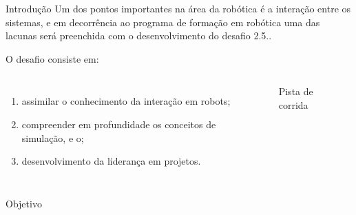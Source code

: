 \begin{frame}[t]{Introdução} 
    \transdissolve[duration=0.5]
    Um dos pontos importantes na área da robótica é a interação entre os sistemas, e em decorrência ao programa de formação em robótica uma das lacunas será preenchida com o desenvolvimento do desafio 2.5..

    O desafio consiste em:
        \begin{columns}[t]
                \begin{enumerate}
                    \item assimilar o conhecimento da interação em robots;
                    \item compreender em profundidade os conceitos de simulação, e o;
                    \item desenvolvimento da liderança em projetos.
                \end{enumerate}
            \begin{center}
                \begin{figure}
                    \caption{Pista de corrida \cite{agostini2007}}
                \end{figure}
            \end{center}
        \end{columns}
\end{frame}
\begin{frame}[c]{Objetivo} 
    \transdissolve[duration=0.5]
   
    \begin{center}
    \end{center}
    
   
\end{frame}
